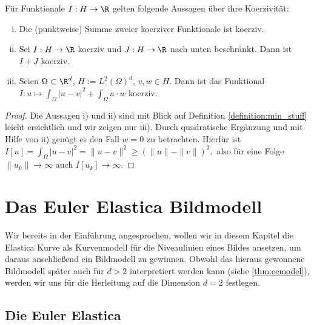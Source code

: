 \documentclass{mythesis}
\begin{document}
\begin{proposition} \label{proposition:coercivity}
    Für Funktionale $I: H \to \R$ gelten folgende Aussagen über ihre Koerzivität:
    \begin{enumerate}[i)]
        \item
	   Die (punktweise) Summe zweier koerziver Funktionale ist koerziv.
       \item
	   Sei $I: H \to \R$ koerziv und $J: H \to \R$ nach unten beschränkt.
	   Dann ist $I + J$ koerziv.
       \item
	   Seien $\Omega \subset \R^d$, $H := L^2(\Omega)^d$, $v, w \in H$.
	   Dann ist das Funktional
	   \begin{math}
	       I: u \mapsto \int_\Omega |u - v|^2 + \int_\Omega u \cdot w
	   \end{math}
	   koerziv.
    \end{enumerate}
    \begin{proof}
	Die Aussagen i) und ii) sind mit Blick auf Definition \ref{definition:min_stuff} leicht ersichtlich und wir zeigen nur iii).
	Durch quadratische Ergänzung und mit Hilfe von ii) genügt es den Fall $w = 0$ zu betrachten.
	Hierfür ist
	\begin{math}
	    I[u] = \int_\Omega |u - v|^2 = \|u - v\|^2 \ge (\|u\| - \|v\|)^2,
	\end{math}
	also für eine Folge $\|u_k\| \to \infty$ auch $I[u_k] \to \infty$.
    \end{proof}
\end{proposition}







\chapter{Das Euler Elastica Bildmodell} \label{chap:image_model}


Wir bereits in der Einführung angesprochen, wollen wir in diesem Kapitel die Elastica Kurve als Kurvenmodell für die Niveaulinien eines Bildes ansetzen, um daraus anschließend ein Bildmodell zu gewinnen.
Obwohl das hieraus gewonnene Bildmodell später auch für $d > 2$ interpretiert werden kann (siehe \ref{thm:eemodel}), werden wir uns für die Herleitung auf die Dimension $d = 2$ festlegen.

\section{Die Euler Elastica}
\end{document}
